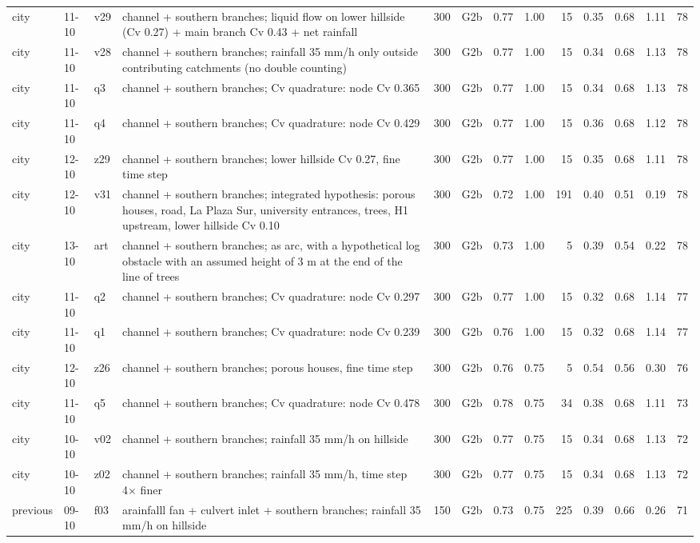{\begin{longtable}{lll>{\raggedright\arraybackslash}p{3.3cm}rlrrrrrrr}
city & 11-10 & v29 & channel + southern branches; liquid flow on lower hillside (Cv 0.27) + main branch Cv 0.43 + net rainfall & 300 & G2b & 0.77 & 1.00 & 15 & 0.35 & 0.68 & 1.11 & 78\\
city & 11-10 & v28 & channel + southern branches; rainfall 35 mm/h only outside contributing catchments (no double counting) & 300 & G2b & 0.77 & 1.00 & 15 & 0.34 & 0.68 & 1.13 & 78\\
city & 11-10 & q3 & channel + southern branches; Cv quadrature: node Cv 0.365 & 300 & G2b & 0.77 & 1.00 & 15 & 0.34 & 0.68 & 1.13 & 78\\
city & 11-10 & q4 & channel + southern branches; Cv quadrature: node Cv 0.429 & 300 & G2b & 0.77 & 1.00 & 15 & 0.36 & 0.68 & 1.12 & 78\\
city & 12-10 & z29 & channel + southern branches; lower hillside Cv 0.27, fine time step & 300 & G2b & 0.77 & 1.00 & 15 & 0.35 & 0.68 & 1.11 & 78\\
city & 12-10 & v31 & channel + southern branches; integrated hypothesis: porous houses, road, La Plaza Sur, university entrances, trees, H1 upstream, lower hillside Cv 0.10 & 300 & G2b & 0.72 & 1.00 & 191 & 0.40 & 0.51 & 0.19 & 78\\
city & 13-10 & art & channel + southern branches; as arc, with a hypothetical log obstacle with an assumed height of 3 m at the end of the line of trees & 300 & G2b & 0.73 & 1.00 & 5 & 0.39 & 0.54 & 0.22 & 78\\
city & 11-10 & q2 & channel + southern branches; Cv quadrature: node Cv 0.297 & 300 & G2b & 0.77 & 1.00 & 15 & 0.32 & 0.68 & 1.14 & 77\\
city & 11-10 & q1 & channel + southern branches; Cv quadrature: node Cv 0.239 & 300 & G2b & 0.76 & 1.00 & 15 & 0.32 & 0.68 & 1.14 & 77\\
city & 12-10 & z26 & channel + southern branches; porous houses, fine time step & 300 & G2b & 0.76 & 0.75 & 5 & 0.54 & 0.56 & 0.30 & 76\\
city & 11-10 & q5 & channel + southern branches; Cv quadrature: node Cv 0.478 & 300 & G2b & 0.78 & 0.75 & 34 & 0.38 & 0.68 & 1.11 & 73\\
city & 10-10 & v02 & channel + southern branches; rainfall 35 mm/h on hillside & 300 & G2b & 0.77 & 0.75 & 15 & 0.34 & 0.68 & 1.13 & 72\\
city & 10-10 & z02 & channel + southern branches; rainfall 35 mm/h, time step 4× finer & 300 & G2b & 0.77 & 0.75 & 15 & 0.34 & 0.68 & 1.13 & 72\\
previous & 09-10 & f03 & arainfalll fan + culvert inlet + southern branches; rainfall 35 mm/h on hillside & 150 & G2b & 0.73 & 0.75 & 225 & 0.39 & 0.66 & 0.26 & 71\\

\end{longtable}}
